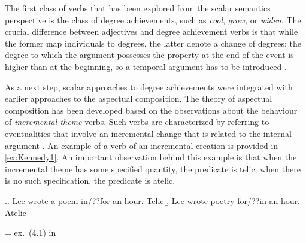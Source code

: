 The first class of verbs that has been explored from the scalar semantics perspective is the class of degree achievements, such as \textit{cool}, \textit{grow,} or \textit{widen}. The crucial difference between adjectives and degree achievement verbs is that while the former map individuals to degrees, the latter denote a change of degrees: the degree to which the argument possesses the property at the end of the event is higher than at the beginning, so a temporal argument has to be introduced \citep{Hay:99, KennedyLevin:02}.


As a next step, scalar approaches to degree achievements were integrated with earlier approaches to the aspectual composition. The theory of aspectual composition has been developed based on the observations about the behaviour of \textit{incremental theme} verbs. Such verbs are characterized by referring to eventualities that involve an incremental change that is related to the internal argument \citep[see][]{Garey:57, Wierzbicka:67, Verkuyl:72, Krifka:86, Krifka:92, Filip:92, Filip:99}. An example of a verb of an incremental creation is provided in \ref{ex:Kennedy1}. An important observation behind this example is that when the incremental theme has some specified quantity, the predicate is telic; when there is no such specification, the predicate is atelic.


\ex.\label{ex:Kennedy1}\a. Lee wrote a poem in/??for an hour. \hfill Telic
\b. Lee wrote poetry for/??in an hour. \hfill Atelic\\
\begin{flushright}
\vspace{-0.5em}
= ex.~(4.1) in \citealt[103]{Kennedy:12}
\end{flushright}


%

